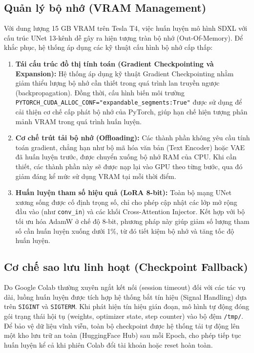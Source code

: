 \documentclass[../main.tex]{subfiles}
\begin{document}
\subsection{Quản lý bộ nhớ (VRAM Management)}
Với dung lượng 15 GB VRAM trên Tesla T4, việc huấn luyện mô hình SDXL với cấu trúc UNet 13-kênh dễ gây ra hiện tượng tràn bộ nhớ (Out-Of-Memory). Để khắc phục, hệ thống áp dụng các kỹ thuật cấu hình bộ nhớ cấp thấp:
\begin{enumerate}
    \item \textbf{Tái cấu trúc đồ thị tính toán (Gradient Checkpointing và Expansion):} 
    Hệ thống áp dụng kỹ thuật Gradient Checkpointing nhằm giảm thiểu lượng bộ nhớ cần thiết trong quá trình lan truyền ngược (backpropagation). Đồng thời, cấu hình biến môi trường \texttt{PYTORCH\_CUDA\_ALLOC\_CONF="expandable\_segments:True"} được sử dụng để cải thiện cơ chế cấp phát bộ nhớ của PyTorch, giúp hạn chế hiện tượng phân mảnh VRAM trong quá trình huấn luyện.

    \item \textbf{Cơ chế trút tải bộ nhớ (Offloading):} 
    Các thành phần không yêu cầu tính toán gradient, chẳng hạn như bộ mã hóa văn bản (Text Encoder) hoặc VAE đã huấn luyện trước, được chuyển xuống bộ nhớ RAM của CPU. Khi cần thiết, các thành phần này sẽ được nạp lại vào GPU theo từng bước, qua đó giảm đáng kể mức sử dụng VRAM tại mỗi thời điểm.

    \item \textbf{Huấn luyện tham số hiệu quả (LoRA 8-bit):} 
    Toàn bộ mạng UNet xương sống được cố định trọng số, chỉ cho phép cập nhật các lớp mở rộng đầu vào (như \texttt{conv\_in}) và các khối Cross-Attention Injector. Kết hợp với bộ tối ưu hóa AdamW ở chế độ 8-bit, phương pháp này giúp giảm số lượng tham số cần huấn luyện xuống dưới 1\%, từ đó tiết kiệm bộ nhớ và tăng tốc độ huấn luyện.
\end{enumerate}

\subsection{Cơ chế sao lưu linh hoạt (Checkpoint Fallback)}
Do Google Colab thường xuyên ngắt kết nối (session timeout) đối với các tác vụ dài, luồng huấn luyện được tích hợp hệ thống bắt tín hiệu (Signal Handling) dựa trên \texttt{SIGINT} và \texttt{SIGTERM}. Khi phát hiện tín hiệu gián đoạn, mô hình tự động đóng gói trạng thái hội tụ (weights, optimizer state, step counter) vào bộ đệm \texttt{/tmp/}. Để bảo vệ dữ liệu vĩnh viễn, toàn bộ checkpoint được hệ thống tải tự động lên một kho lưu trữ an toàn (HuggingFace Hub) sau mỗi Epoch, cho phép tiếp tục huấn luyện kể cả khi phiên Colab đổi tài khoản hoặc reset hoàn toàn.
\end{document}
